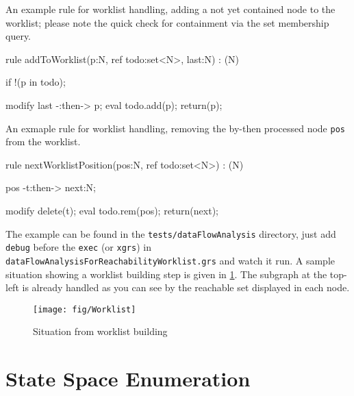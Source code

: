   \begin{example}
An example rule for worklist handling, adding a not yet contained node to the worklist; please note the quick check for containment via the set membership query.
    \begin{grgen}
rule addToWorklist(p:N, ref todo:set<N>, last:N) : (N)
{
  if{ !(p in todo); }

  modify {
    last -:then-> p;
    eval { todo.add(p); }
    return(p);
  }
}
    \end{grgen}
  \end{example}

  \begin{example}
An exmaple rule for worklist handling, removing the by-then processed node \texttt{pos} from the worklist.
    \begin{grgen}
rule nextWorklistPosition(pos:N, ref todo:set<N>) : (N)
{
  pos -t:then-> next:N;

  modify {
    delete(t);
    eval { todo.rem(pos); }
    return(next);
  }
}
    \end{grgen}
  \end{example}

The example can be found in the \texttt{tests/dataFlowAnalysis} directory, just add \texttt{debug} before the \texttt{exec} (or \texttt{xgrs}) in \texttt{dataFlowAnalysisForReachabilityWorklist.grs} and watch it run.
A sample situation showing a worklist building step is given in \ref{figworklist}.
The subgraph at the top-left is already handled as you can see by the reachable set displayed in each node.

\begin{figure}[htbp]
  \centering
  \texttt{[image: fig/Worklist]}
  \caption{Situation from worklist building}
  \label{figworklist}
\end{figure}


\section{State Space Enumeration}\label{sec:statespaceenum}

